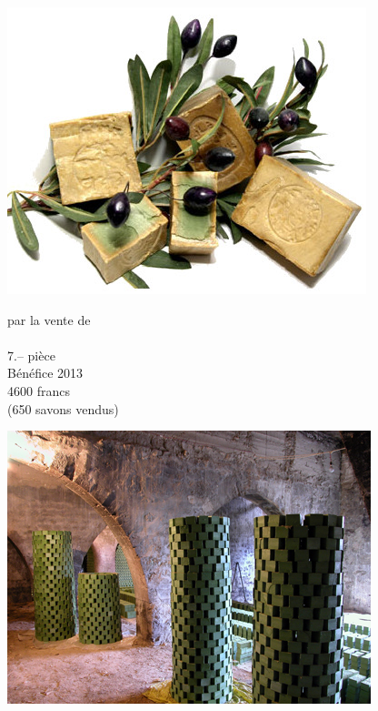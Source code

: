 \documentclass[frenchb,16pt,parskip=half-]{scrartcl}
\begin{document}
\begin{center}
\end{center}\vspace{-2em}
\begin{minipage}[c]{5cm}
    \includegraphics[width=\linewidth]{img/sav04.jpg}
\end{minipage}\hfill
\begin{minipage}[c]{8.5cm}\centering\huge
	par la vente de\\ \\ 7.-- pièce
	\\\small
   Bénéfice 2013\\
	4600 francs\\
	(650 savons vendus)
\end{minipage}\hfill
\begin{minipage}[c]{5cm}
    \includegraphics[width=\linewidth]{img/sav03.jpg}
\end{minipage}\vfill
\end{document}
